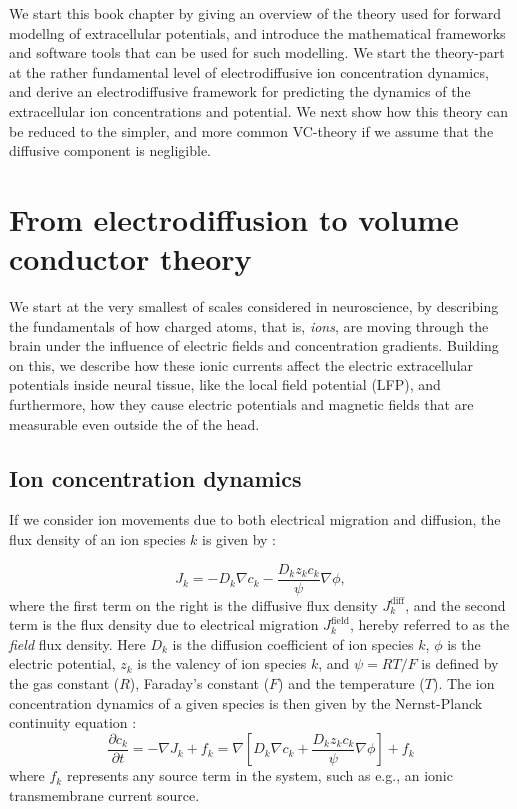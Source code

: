 \documentclass[preprint,11pt,authoryear]{elsarticle}
\newcommand{\hlj}[2][OliveGreen]{ {\sethlcolor{#1} \hl{#2}} }
\newcommand{\tvnnote}[1]{\color{white}{\hlj{TVN: #1 }}\color{black}}
\newcommand{\tvntxt}[1]{{\color{OliveGreen}#1}}
\begin{document}
We start this book chapter by giving an overview of the theory used for forward modellng of extracellular potentials, and introduce the mathematical frameworks and software tools that can be used for such modelling. We start the theory-part at the rather fundamental level of electrodiffusive ion concentration dynamics, and derive an electrodiffusive framework for predicting the dynamics of the extracellular ion concentrations and potential. We next show how this theory can be reduced to the simpler, and more common VC-theory if we assume that the diffusive component is negligible. 

\section{%
From electrodiffusion to volume conductor theory}
\label{sec:theory}
\tvntxt{We start at the very smallest of scales considered in neuroscience, by describing the fundamentals of how charged atoms, that is, {\it ions}, are moving through the brain under the influence of electric fields and concentration gradients. Building on this, we describe how these ionic currents affect the electric extracellular potentials inside neural tissue, like the local field potential (LFP), and furthermore, how they cause electric potentials and magnetic fields that are measurable even outside the of the head.
}
\subsection{Ion concentration dynamics}
\label{sec:eldiff}
If we consider ion movements due to both electrical migration and diffusion, the flux density of an ion species $k$ is given by \tvnnote{cite?}:

\begin{equation}
J_{k} = -D_{k}\nabla c_{k} - \frac{D_k z_k c_k}{\psi} \nabla \phi,
\label{eq:JNP}
\end{equation}
where the first term on the right is the diffusive flux density $J_{k}^\text{diff}$, and the second term is the flux density due to electrical migration $J_{k}^\text{field}$, hereby referred to as the \emph{field} flux density.  Here $D_{k}$ is the diffusion coefficient of ion species $k$, $\phi$ is the electric potential, $z_{k}$ is the valency of ion species $k$, and $\psi=RT/F$ is defined by the gas constant ($R$), Faraday's constant ($F$)  and the temperature ($T$). The ion concentration dynamics of a given species is then given by the Nernst-Planck continuity equation  \tvnnote{cite?}: 
\begin{equation}
\frac{\partial c_k}{\partial t} = - \nabla J_k + f_k = \nabla \left[ D_k \nabla c_k + \frac{D_k z_k c_k}{\psi} \nabla \phi \right] + f_k
\label{eq:NP}
\end{equation}
where $f_k$ represents any source term in the system, such as e.g., an ionic transmembrane current source. 
\end{document}
